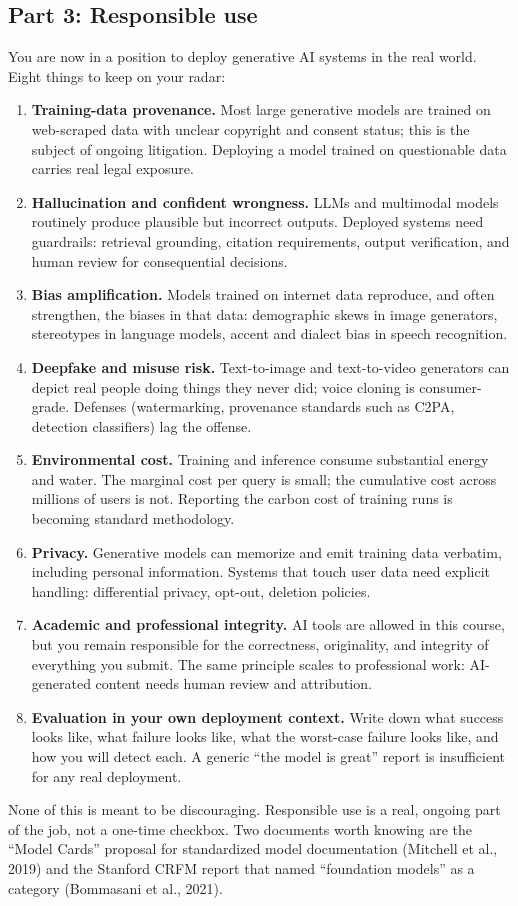 \documentclass[11pt]{article}
\theoremstyle{remark}
\begin{document}
\subsection{Part 3: Responsible use}
You are now in a position to deploy generative AI systems in the real world. Eight things to keep on your radar:
\begin{enumerate}[leftmargin=1.6em]
  \item \textbf{Training-data provenance.} Most large generative models are trained on web-scraped data with unclear copyright and consent status; this is the subject of ongoing litigation. Deploying a model trained on questionable data carries real legal exposure.
  \item \textbf{Hallucination and confident wrongness.} LLMs and multimodal models routinely produce plausible but incorrect outputs. Deployed systems need guardrails: retrieval grounding, citation requirements, output verification, and human review for consequential decisions.
  \item \textbf{Bias amplification.} Models trained on internet data reproduce, and often strengthen, the biases in that data: demographic skews in image generators, stereotypes in language models, accent and dialect bias in speech recognition.
  \item \textbf{Deepfake and misuse risk.} Text-to-image and text-to-video generators can depict real people doing things they never did; voice cloning is consumer-grade. Defenses (watermarking, provenance standards such as C2PA, detection classifiers) lag the offense.
  \item \textbf{Environmental cost.} Training and inference consume substantial energy and water. The marginal cost per query is small; the cumulative cost across millions of users is not. Reporting the carbon cost of training runs is becoming standard methodology.
  \item \textbf{Privacy.} Generative models can memorize and emit training data verbatim, including personal information. Systems that touch user data need explicit handling: differential privacy, opt-out, deletion policies.
  \item \textbf{Academic and professional integrity.} AI tools are allowed in this course, but you remain responsible for the correctness, originality, and integrity of everything you submit. The same principle scales to professional work: AI-generated content needs human review and attribution.
  \item \textbf{Evaluation in your own deployment context.} Write down what success looks like, what failure looks like, what the worst-case failure looks like, and how you will detect each. A generic ``the model is great'' report is insufficient for any real deployment.
\end{enumerate}
None of this is meant to be discouraging. Responsible use is a real, ongoing part of the job, not a one-time checkbox. Two documents worth knowing are the ``Model Cards'' proposal for standardized model documentation (Mitchell et al., 2019) and the Stanford CRFM report that named ``foundation models'' as a category (Bommasani et al., 2021).
\end{document}
